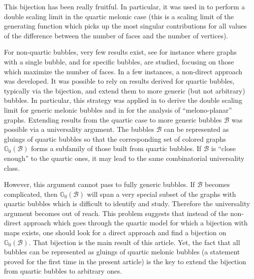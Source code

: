 \documentclass[aps,prd,10pt,notitlepage,nofootinbib,superscriptaddress,showkeys,showpacs]{revtex4-1}
\begin{document}
This bijection has been really fruitful. In particular, it was used in \cite{DSDartois} to perform a double scaling limit in the quartic melonic case (this is a scaling limit of the generating function which picks up the most singular contributions for all values of the difference between the number of faces and the number of vertices).

For non-quartic bubbles, very few results exist, see for instance \cite{Meanders, UnitaryInt} where graphs with a single bubble, and for specific bubbles, are studied, focusing on those which maximize the number of faces. In a few instances, a non-direct approach was developed. It was possible to rely on results derived for quartic bubbles, typically via the bijection, and extend them to more generic (but not arbitrary) bubbles. In particular, this strategy was applied in \cite{DSSD} to derive the double scaling limit for generic melonic bubbles and in \cite{Melonoplanar} for the analysis of \enquote{melono-planar} graphs. Extending results from the quartic case to more generic bubbles ${\mathcal{B}}$ was possible via a universality argument. The bubbles ${\mathcal{B}}$ can be represented as gluings of quartic bubbles so that the corresponding set of colored graphs ${\mathbb{G}}_0({\mathcal{B}})$ forms a subfamily of those built from quartic bubbles. If ${\mathcal{B}}$ is \enquote{close enough} to the quartic ones, it may lead to the same combinatorial universality class.

However, this argument cannot pass to fully generic bubbles. If ${\mathcal{B}}$ becomes complicated, then ${\mathbb{G}}_0({\mathcal{B}})$ will span a very special subset of the graphs with quartic bubbles which is difficult to identify and study. Therefore the universality argument becomes out of reach. This problem suggests that instead of the non-direct approach which goes through the quartic model for which a bijection with maps exists, one should look for a direct approach and find a bijection on ${\mathbb{G}}_0({\mathcal{B}})$. That bijection is the main result of this article. Yet, the fact that all bubbles can be represented as gluings of quartic melonic bubbles (a statement proved for the first time in the present article) is the key to extend the bijection from quartic bubbles to arbitrary ones.
\end{document}
